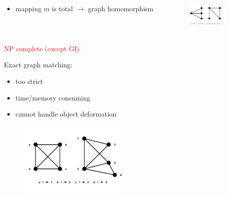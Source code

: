 \documentclass[hyperref={pdfpagelabels=false}]{beamer}
\begin{document}
\begin{frame}[allowframebreaks]
\begin{minipage}[0.2\textheight]{\textwidth}
	\begin{columns}[T]
		\begin{column}{0.6\textwidth}
			\begin{itemize}
			\item mapping $m$ is total\hspace{15pt} $\rightarrow$ graph homomorphism
			\end{itemize}
		\end{column}
		\begin{column}{0.3\textwidth}
			\begin{figure}[h!]
			    \centering
			    \includegraphics[width=2cm]{fig/homomorphism}
			\end{figure}
		\end{column}
	\end{columns}
\end{minipage}
\textcolor{red}{NP complete (except GI)~\cite{Garey_NPComplet}}

\framebreak
Exact graph matching:
\begin{itemize}
\item too strict
\item time/memory consuming
\item cannot handle object deformation
\end{itemize}
\begin{figure}[htb]
	\centering
	\includegraphics[width=0.5\textwidth]{fig/inexactGM}
\end{figure}
\end{frame}
\end{document}

